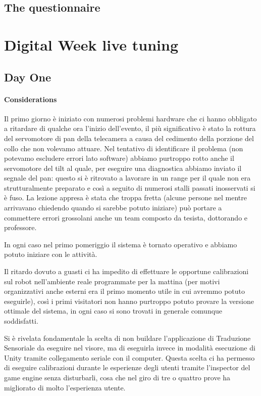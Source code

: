 \documentclass{Configuration_Files/PoliMi3i_thesis}
\begin{document}
\subsection{The questionnaire}

\section{Digital Week live tuning}

\subsection{Day One}

\paragraph{Considerations}

Il primo giorno è iniziato con numerosi problemi hardware che ci hanno obbligato a ritardare di qualche ora l’inizio dell’evento, il più significativo è stato la rottura del servomotore di pan della telecamera a causa del cedimento della porzione del collo che non volevamo attuare. Nel tentativo di identificare il problema (non potevamo escludere errori lato software) abbiamo purtroppo rotto anche il servomotore del tilt al quale, per eseguire una diagnostica abbiamo inviato il segnale del pan: questo si è ritrovato a lavorare in un range per il quale non era strutturalmente preparato e così a seguito di numerosi stalli passati inosservati si è fuso. La lezione appresa è stata che troppa fretta (alcune persone nel mentre arrivavano chiedendo quando si sarebbe potuto iniziare) può portare a commettere errori grossolani anche un team composto da tesista, dottorando e professore.

In ogni caso nel primo pomeriggio il sistema è tornato operativo e abbiamo potuto iniziare con le attività.

Il ritardo dovuto a guasti ci ha impedito di effettuare le opportune calibrazioni sul robot nell’ambiente reale programmate per la mattina (per motivi organizzativi anche esterni era il primo momento utile in cui avremmo potuto eseguirle), così i primi visitatori non hanno purtroppo potuto provare la versione ottimale del sistema, in ogni caso si sono trovati in generale comunque soddisfatti.

Si è rivelata fondamentale la scelta di non buildare l’applicazione di Traduzione Sensoriale da eseguire nel visore, ma di eseguirla invece in modalità esecuzione di Unity tramite collegamento seriale con il computer. Questa scelta ci ha permesso di eseguire calibrazioni durante le esperienze degli utenti tramite l’inspector del game engine senza disturbarli, cosa che nel giro di tre o quattro prove ha migliorato di molto l’esperienza utente.
\end{document}
